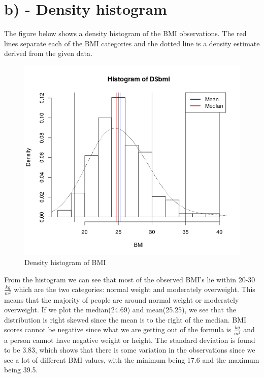 \documentclass{memoir}
\begin{document}
\section{b) - Density histogram}
The figure below shows a density histogram of the BMI observations. The red lines separate each of the BMI categories and the dotted line is a density estimate derived from the given data. 
\begin{figure}[H]
	\centering
	\includegraphics[scale=0.7]{Hist.png}
	\caption{Density histogram of BMI}
\end{figure}
From the histogram we can see that most of the observed BMI's lie within 20-30 $\frac{kg}{m^2}$ which are the two categories: normal weight and moderately overweight. This means that the majority of people are around normal weight or moderately overweight. If we plot the median(24.69) and mean(25.25), we see that the distribution is right skewed since the mean is to the right of the median. 
BMI scores cannot be negative since what we are getting out of the formula is $\frac{kg}{m^2}$ and a person cannot have negative weight or height. 
The standard deviation is found to be 3.83, which shows that there is some variation in the observations since we see a lot of different BMI values, with the minimum being 17.6 and the maximum being 39.5. 
\end{document}
